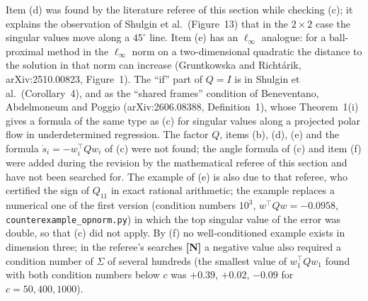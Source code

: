\documentclass[11pt]{article}
\theoremstyle{definition}
\theoremstyle{remark}
\begin{document}
Item (d) was found by the literature referee of this section while checking (c); it explains the observation of Shulgin
et al.\ (Figure~13) that in the $2\times2$ case the singular values move along a $45^\circ$ line. Item (e) has an
$\ell_\infty$ analogue: for a ball-proximal method in the $\ell_\infty$ norm on a two-dimensional quadratic the distance
to the solution in that norm can increase (Gruntkowska and Richt\'arik, arXiv:2510.00823, Figure~1). The ``if'' part of
$Q=I$ is in Shulgin et al.\ (Corollary~4), and as the ``shared frames'' condition of Beneventano, Abdelmoneum and
Poggio (arXiv:2606.08388, Definition~1), whose Theorem~1(i) gives a formula of the same type as (c) for singular values
along a projected polar flow in underdetermined regression. The factor $Q$, items (b), (d), (e) and the formula
$\dot s_i=-w_i^\top Qw_i$ of (c) were not found; the angle formula of (c) and item (f) were added during the revision by
the mathematical referee of this section and have not been searched for. The example of (e) is also due to that
referee, who certified the sign of $Q_{11}$ in exact rational
arithmetic; the example replaces a numerical one of the first version (condition numbers $10^3$,
$w^\top Qw=-0.0958$, \texttt{counterexample\_opnorm.py}) in which the top singular value of the error was double, so
that (c) did not apply. By (f) no well-conditioned example exists in dimension three; in the referee's searches
\textbf{[N]} a negative value also required a condition number of $\Sigma$ of several hundreds (the smallest value of
$w_1^\top Qw_1$ found with both condition numbers below $c$ was $+0.39$, $+0.02$, $-0.09$ for $c=50,400,1000$).
\end{document}
